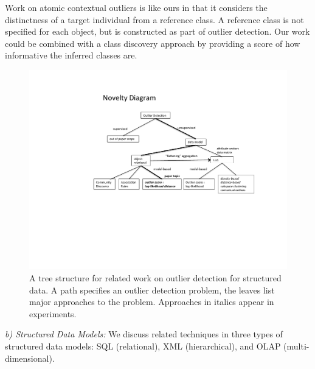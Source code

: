{				Work on atomic contextual  outliers \cite{Tang2013} is like ours in that it considers the distinctness of a target individual from a reference class. A reference class is not specified for each object,
				but is constructed as part of outlier detection. 
				Our work could be combined with a class discovery approach by providing a score of how informative the inferred classes are. 
				\begin{figure}
					\centering
					\includegraphics[width=1\textwidth] {NoveltyDiagram.pdf}
					\caption{A tree structure for related work on outlier detection for structured data. A path specifies an outlier detection problem, the leaves list major approaches to the problem. Approaches in italics appear in experiments.
						\label{fig:novelty}}
				\end{figure}
				
				\textit{b) Structured Data Models:} We discuss related techniques in three types of structured data models: SQL (relational), XML (hierarchical), and OLAP (multi-dimensional). 
				
}
